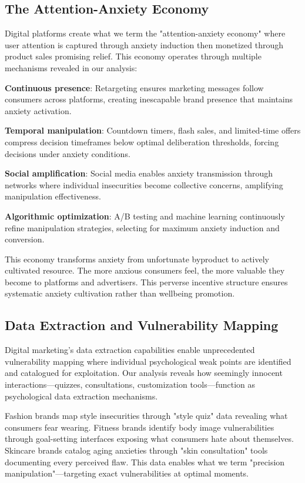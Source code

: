 \subsection{The Attention-Anxiety Economy}

Digital platforms create what we term the "attention-anxiety economy" where user attention is captured through anxiety induction then monetized through product sales promising relief. This economy operates through multiple mechanisms revealed in our analysis:

\textbf{Continuous presence}: Retargeting ensures marketing messages follow consumers across platforms, creating inescapable brand presence that maintains anxiety activation.

\textbf{Temporal manipulation}: Countdown timers, flash sales, and limited-time offers compress decision timeframes below optimal deliberation thresholds, forcing decisions under anxiety conditions.

\textbf{Social amplification}: Social media enables anxiety transmission through networks where individual insecurities become collective concerns, amplifying manipulation effectiveness.

\textbf{Algorithmic optimization}: A/B testing and machine learning continuously refine manipulation strategies, selecting for maximum anxiety induction and conversion.

This economy transforms anxiety from unfortunate byproduct to actively cultivated resource. The more anxious consumers feel, the more valuable they become to platforms and advertisers. This perverse incentive structure ensures systematic anxiety cultivation rather than wellbeing promotion.

\subsection{Data Extraction and Vulnerability Mapping}

Digital marketing's data extraction capabilities enable unprecedented vulnerability mapping where individual psychological weak points are identified and catalogued for exploitation. Our analysis reveals how seemingly innocent interactions—quizzes, consultations, customization tools—function as psychological data extraction mechanisms.

Fashion brands map style insecurities through "style quiz" data revealing what consumers fear wearing. Fitness brands identify body image vulnerabilities through goal-setting interfaces exposing what consumers hate about themselves. Skincare brands catalog aging anxieties through "skin consultation" tools documenting every perceived flaw. This data enables what we term "precision manipulation"—targeting exact vulnerabilities at optimal moments.

